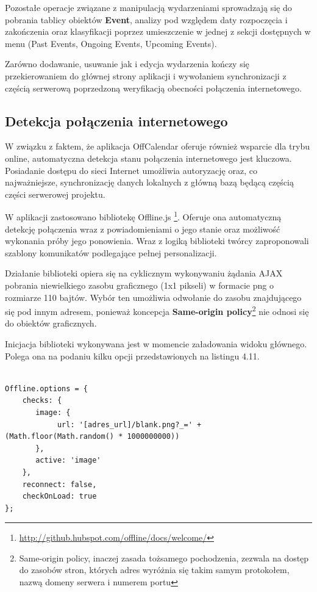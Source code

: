 Pozostałe operacje związane z manipulacją wydarzeniami sprowadzają się do pobrania tablicy obiektów \textbf{Event}, analizy pod względem daty rozpoczęcia i zakończenia oraz klasyfikacji poprzez umieszczenie w jednej z sekcji dostępnych w menu (Past Events, Ongoing Events, Upcoming Events).

Zarówno dodawanie, usuwanie jak i edycja wydarzenia kończy się przekierowaniem do głównej strony aplikacji i wywołaniem synchronizacji z częścią serwerową poprzedzoną weryfikacją obecności połączenia internetowego.

\subsection{Detekcja połączenia internetowego}
\label{sec:detPolInt}

W związku z faktem, że aplikacja OffCalendar oferuje również wsparcie dla trybu online, automatyczna detekcja stanu połączenia internetowego jest kluczowa. Posiadanie dostępu do sieci Internet umożliwia autoryzację oraz, co najważniejsze, synchronizację danych lokalnych z główną bazą będącą częścią części serwerowej projektu.

W aplikacji zastosowano bibliotekę Offline.js \footnote{\url{http://github.hubspot.com/offline/docs/welcome/}}. Oferuje ona automatyczną detekcję połączenia wraz z powiadomieniami o jego stanie oraz możliwość wykonania próby jego ponowienia. Wraz z logiką biblioteki twórcy zaproponowali szablony komunikatów podlegające pełnej personalizacji.

Działanie biblioteki opiera się na cyklicznym wykonywaniu żądania AJAX pobrania niewielkiego zasobu graficznego (1x1 pikseli) w formacie png o rozmiarze 110 bajtów. Wybór ten umożliwia odwołanie do zasobu znajdującego się pod innym adresem, ponieważ koncepcja \textbf{Same-origin policy}\footnote{Same-origin policy, inaczej zasada tożsamego pochodzenia, zezwala na dostęp do zasobów stron, których adres wyróżnia się takim samym protokołem, nazwą domeny serwera i numerem portu\cite{sameOrigin}} nie odnosi się do obiektów graficznych.

Inicjacja biblioteki wykonywana jest w momencie załadowania widoku głównego. Polega ona na podaniu kilku opcji przedstawionych na listingu 4.11.

\begin{lstlisting}[caption=Inicjalizacja biblioteki Offline.js badającej stan połączenia internetowego., label=amb, captionpos=b]

Offline.options = {
	checks: {
   	   image: {
            url: '[adres_url]/blank.png?_=' + (Math.floor(Math.random() * 1000000000))
       },
       active: 'image'
    },
    reconnect: false,
    checkOnLoad: true
};

\end{lstlisting}

